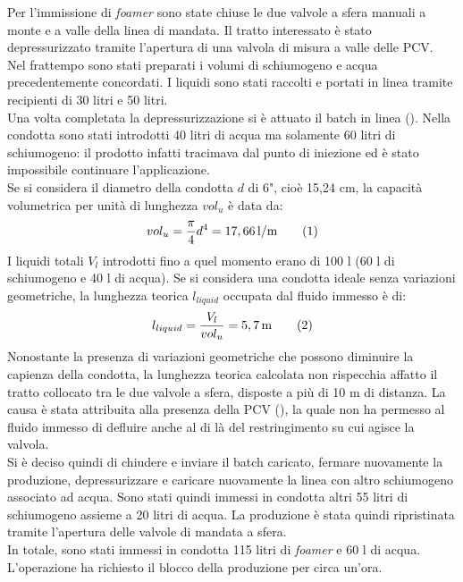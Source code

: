 Per l'immissione di \textit{foamer} sono state chiuse le due valvole a sfera manuali a monte e a valle della linea di mandata. Il tratto interessato è stato depressurizzato tramite l'apertura di una valvola di misura a valle delle PCV.\\
Nel frattempo sono stati preparati i volumi di schiumogeno e acqua precedentemente concordati. I liquidi sono stati raccolti e portati in linea tramite recipienti di 30 litri e 50 litri. \\
Una volta completata la depressurizzazione si è attuato il batch in linea (). Nella condotta sono stati introdotti 40 litri di acqua ma solamente 60 litri di schiumogeno: il prodotto infatti tracimava dal punto di iniezione ed è stato impossibile continuare l'applicazione.\\
Se si considera il diametro della condotta \(d\) di 6", cioè 15,24 cm, la capacità volumetrica per unità di lunghezza \(vol_u\) è data da:
\[vol_{u}=\dfrac{\pi}{4}d^4=17,66 \, \mathrm{l/m} \addtag \]
I liquidi totali \(V_l\) introdotti fino a quel momento erano di 100 l (60 l di schiumogeno e 40 l di acqua). Se si considera una condotta ideale senza variazioni geometriche, la lunghezza teorica \(l_{liquid}\) occupata dal fluido immesso è di:
\[l_{liquid}=\dfrac{V_l}{vol_u}=5,7 \, \mathrm{m} \addtag \]
Nonostante la presenza di variazioni geometriche che possono diminuire la capienza della condotta, la lunghezza teorica calcolata non rispecchia affatto il tratto collocato tra le due valvole a sfera, disposte a più di 10 m di distanza. La causa è stata attribuita alla presenza della PCV (), la quale non ha permesso al fluido immesso di defluire anche al di là del restringimento su cui agisce la valvola.\\
Si è deciso quindi di chiudere e inviare il batch caricato, fermare nuovamente la produzione, depressurizzare e caricare nuovamente la linea con altro schiumogeno associato ad acqua. Sono stati quindi immessi in condotta altri 55 litri di schiumogeno assieme a 20 litri di acqua. La produzione è stata quindi ripristinata tramite l'apertura delle valvole di mandata a sfera.\\
In totale, sono stati immessi in condotta 115 litri di \textit{foamer} e 60 l di acqua. L'operazione ha richiesto il blocco della produzione per circa un'ora.
